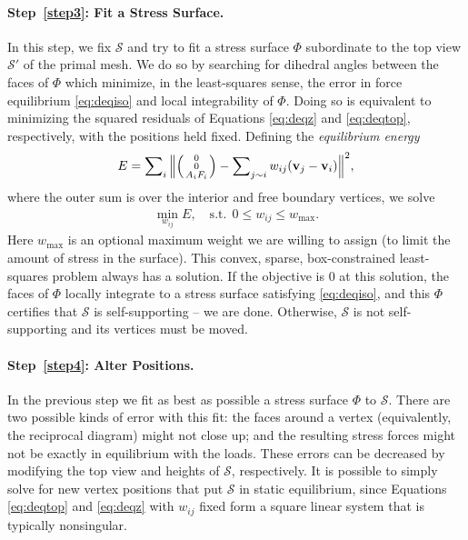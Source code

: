 \documentclass[review]{acmsiggraph}
\makeatletter
\def\Forcevector{\Big(\mbox{\scriptsize
	\def\arraystretch{0.8}\begin{tabular}{@{\,}c@{\,}}
	0 \\ 0 \\ $A_i F_i$
	\end{tabular}}\Big)}
\def\SS{{\mathcal S}}
\makeatother
\begin{document}
\paragraph{Step~\ref{step3}: Fit a Stress Surface.}

In this step, we fix $\SS$ and try to fit a stress surface $\Phi$ 
subordinate to the top view $\SS'$ of the primal mesh. We do so by 
searching for dihedral angles between the faces of $\Phi$ which minimize, 
in the least-squares sense, the error in force equilibrium 
\eqref{eq:deqiso} and local integrability of $\Phi$. Doing so is 
equivalent to minimizing the squared residuals of Equations 
\eqref{eq:deqz} and \eqref{eq:deqtop}, respectively, with the positions 
held fixed. Defining the {\em equilibrium energy}
	\begin{align}
	E = \sum\nolimits_i \Big\| \Forcevector -
		\sum\nolimits_{j\sim i} w_{ij} (\vw_j-\vw_i) \Big\|^2,
	\label{eq:eenergy}
	\end{align}
 where the outer sum is over the interior and free boundary vertices,
we solve
	\begin{align}
	\min_{w_{ij}} E,
	\quad
	\textrm{s.t.}\ \
		0 \leq w_{ij} \leq w_{\max}.
	\label{eq:wbounds}
	\end{align}
 Here $w_{\max}$ is an optional maximum weight we are willing to assign 
(to limit the amount of stress in the surface). This convex, sparse, 
box-constrained least-squares problem \cite{BCLS} always has a solution. 
If the objective is $0$ at this solution, the faces of $\Phi$ locally 
integrate to a stress surface satisfying \eqref{eq:deqiso}, and this $\Phi$ 
certifies that $\SS$ is self-supporting -- we are done. Otherwise, $\SS$ 
is not self-supporting and its vertices must be moved.

\paragraph{Step~\ref{step4}: Alter Positions.} In the previous step we fit 
as best as possible a stress surface $\Phi$ to $\SS$. There are two 
possible kinds of error with this fit: the faces around a vertex 
(equivalently, the reciprocal diagram) might not close up; and the 
resulting stress forces might not be exactly in equilibrium with the 
loads. These errors can be decreased by modifying the top view and heights 
of $\SS$, respectively. It is possible to simply solve for new vertex 
positions that put $\SS$ in static equilibrium, since Equations 
\eqref{eq:deqtop} and \eqref{eq:deqz} with $w_{ij}$ fixed form a square 
linear system that is typically nonsingular.
\end{document}
